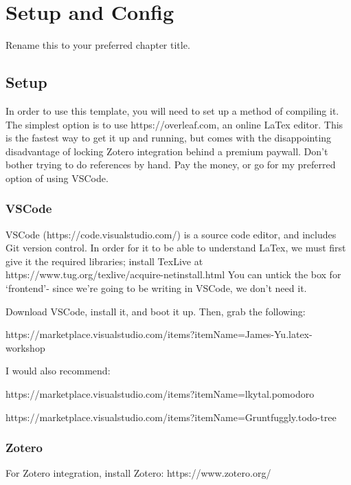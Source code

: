 
\chapter{Setup and Config}\label{ch:chapter2}

Rename this to your preferred chapter title.

\section{Setup}

In order to use this template, you will need to set up a method of compiling it. 
The simplest option is to use https://overleaf.com, an online LaTex editor.
This is the fastest way to get it up and running, but comes with the disappointing disadvantage of locking Zotero integration behind a premium paywall.
Don't bother trying to do references by hand. 
Pay the money, or go for my preferred option of using VSCode.


\subsection{VSCode}
VSCode (https://code.visualstudio.com/) is a source code editor, and includes Git version control. 
In order for it to be able to understand LaTex, we must first give it the required libraries; install TexLive at https://www.tug.org/texlive/acquire-netinstall.html 
You can untick the box for `frontend'- since we're going to be writing in VSCode, we don't need it.

Download VSCode, install it, and boot it up.
Then, grab the following:

https://marketplace.visualstudio.com/items?itemName=James-Yu.latex-workshop

I would also recommend:

https://marketplace.visualstudio.com/items?itemName=lkytal.pomodoro

https://marketplace.visualstudio.com/items?itemName=Gruntfuggly.todo-tree

\subsection{Zotero}

For Zotero integration, install Zotero: https://www.zotero.org/

